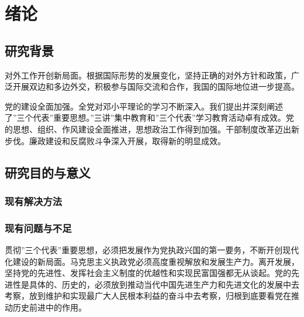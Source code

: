 \documentclass[adobefonts]{njuthesis}
\begin{document}
\tableofcontents

\listoffigures

\listoftables

\mainmatter

\chapter{绪论}\label{chapter_introduction}
\section{研究背景}

对外工作开创新局面。根据国际形势的发展变化，坚持正确的对外方针和政策，广泛开展双边和多边外交，积极参与国际交流和合作，我国的国际地位进一步提高。 

党的建设全面加强。全党对邓小平理论的学习不断深入。我们提出并深刻阐述了”三个代表”重要思想。”三讲”集中教育和”三个代表”学习教育活动卓有成效。党的思想、组织、作风建设全面推进，思想政治工作得到加强。干部制度改革迈出新步伐。廉政建设和反腐败斗争深入开展，取得新的明显成效。


\section{研究目的与意义}
\subsection{现有解决方法}

\subsection{现有问题与不足}

贯彻”三个代表”重要思想，必须把发展作为党执政兴国的第一要务，不断开创现代化建设的新局面。马克思主义执政党必须高度重视解放和发展生产力。离开发展，坚持党的先进性、发挥社会主义制度的优越性和实现民富国强都无从谈起。党的先进性是具体的、历史的，必须放到推动当代中国先进生产力和先进文化的发展中去考察，放到维护和实现最广大人民根本利益的奋斗中去考察，归根到底要看党在推动历史前进中的作用。 
\end{document}

